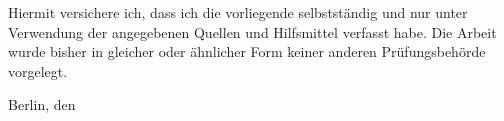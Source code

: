 

Hiermit versichere ich, dass ich die vorliegende \thethesistyp{} selbstständig und nur unter
Verwendung der angegebenen Quellen und Hilfsmittel verfasst habe. 
Die Arbeit wurde bisher in gleicher oder ähnlicher Form keiner anderen Prüfungsbehörde vorgelegt.


\vskip 1cm

Berlin, den \thedatum

\vskip 1.5cm

\theautor